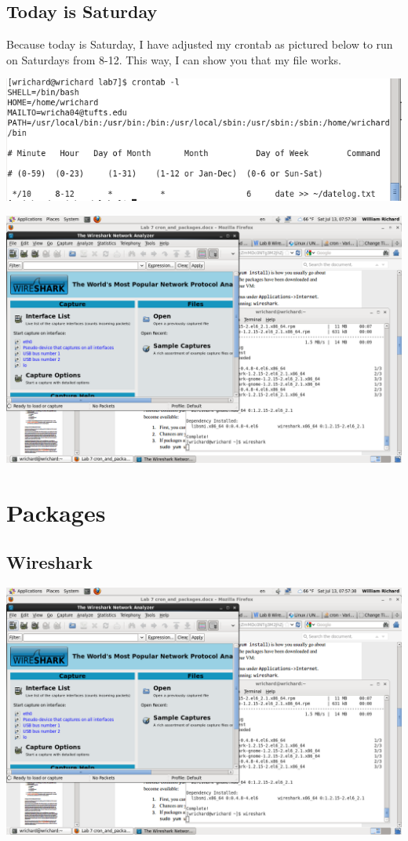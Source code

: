 \documentclass[a4paper,10pt]{article}
\begin{document}
\subsection{Today is Saturday}
Because today is Saturday, I have adjusted my crontab as pictured below to run on Saturdays from 8-12.  This way, I can show you that my file works.

  \begin{center}
  \includegraphics[width=\linewidth]{./crontab_sat.png}
  \end{center}

  \begin{center}
  \includegraphics[width=\linewidth]{./datelog.png}
  \end{center}

\section{Packages}
\subsection{Wireshark}
  \begin{center}
  \includegraphics[width=\linewidth]{./wireshark.png}
  \end{center}
\end{document}
